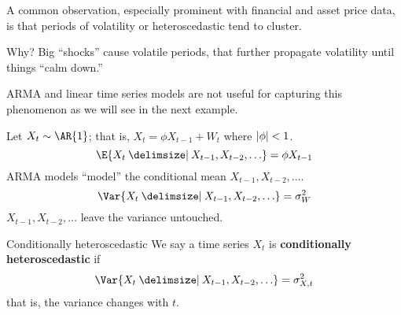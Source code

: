 A common observation, especially prominent with financial and asset
price data, is that periods of volatility or heteroscedastic
tend to cluster.

Why? Big ``shocks'' cause volatile periods, that further propagate
volatility until things ``calm down.''

ARMA and linear time series models are not useful for capturing this phenomenon
as we will see in the next example.
\begin{Example}{}{}
    Let $ X_t \sim \AR{1} $; that is, $ X_t=\phi X_{t-1}+W_t $ where $ \lvert\phi\rvert<1 $.
    \[ \E{X_t\given X_{t-1},X_{t-2},\ldots}=\phi X_{t-1} \]
    ARMA models ``model'' the conditional mean $ X_{t-1},X_{t-2},\ldots $.
    \[ \Var{X_t\given X_{t-1},X_{t-2},\ldots}=\sigma_W^2 \]
    $ X_{t-1},X_{t-2},\ldots $ leave the variance untouched.
\end{Example}
\begin{Definition}{Conditionally heteroscedastic}{}
    We say a time series $ X_t $ is \textbf{conditionally heteroscedastic}
    if
    \[ \Var{X_t\given X_{t-1},X_{t-2},\ldots}=\sigma_{X,t}^2 \]
    that is, the variance changes with $ t $.
\end{Definition}

